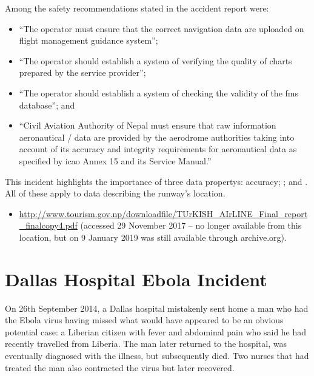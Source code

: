 Among the safety recommendations stated in the accident report were:
\begin{itemize}
  \item ``The operator must ensure that the correct navigation data are uploaded on flight management guidance system''; 
  \item ``The operator should establish a system of verifying the quality of charts prepared by the service provider''; 
  \item ``The operator should establish a system of checking the validity of the \gls{fms} \gls{database}''; and
  \item ``Civil Aviation Authority of Nepal must ensure that raw \gls{information aeronautical} / data are provided by the aerodrome authorities taking into account of its accuracy and \gls{integrity} requirements for \gls{aeronautical data} as specified by \gls{icao} Annex 15 and its  Service Manual.''
\end{itemize}

This incident highlights the importance of three \glspl{data property}: \gls{accuracy}; ; and . All of these apply to data describing the runway's location.

\begin{samepage}
\begin{itemize}
  \item \raggedright{\href{https://web.archive.org/web/20170709044727/http://www.tourism.gov.np/downloadfile/TUrKISH_AIrLINE_Final_report_finalcopy4.pdf}{http://www.tourism.gov.np/downloadfile/TUrKISH\_AIrLINE\_Final\_report\_finalcopy4.pdf} (accessed 29 November 2017 -- no longer available from this location, but on 9 January 2019 was still available through archive.org).}
\end{itemize}
\end{samepage}


\section{Dallas Hospital Ebola Incident} \label{bkm:incacc:dallasebola}
On 26th September 2014, a Dallas hospital mistakenly sent home a man who had the Ebola virus having missed what would have appeared to be an obvious potential case: a Liberian citizen with fever and abdominal pain who said he had recently travelled from Liberia. The man later returned to the hospital, was eventually diagnosed with the illness, but subsequently died. Two nurses that had treated the man also contracted the virus but later recovered.

